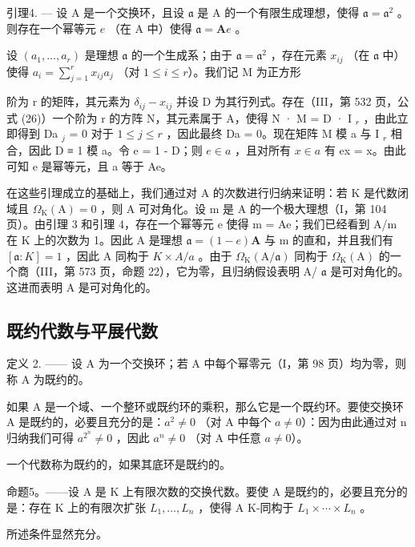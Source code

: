 引理4. --- 设 A 是一个交换环，且设 \(\mathfrak{a}\) 是 A 的一个有限生成理想，使得 \(\mathfrak{a} = \mathfrak{a}^2\) 。则存在一个幂等元 \(e\) （在 A 中）使得 \(\mathfrak{a} = \mathbf{A}e\) 。

设 \((a_{1},\ldots ,a_{r})\) 是理想 \(\mathfrak{a}\) 的一个生成系；由于 \(\mathfrak{a} = \mathfrak{a}^2\) ，存在元素 \(x_{ij}\) （在 \(\mathfrak{a}\) 中）使得 \(a_{i} = \sum_{j = 1}^{r}x_{ij}a_{j}\) （对 \(1\leqslant i\leqslant r\)）。我们记 M 为正方形

阶为 r 的矩阵，其元素为 \(\delta_{ij} - x_{ij}\) 并设 D 为其行列式。存在（III，第 532 页，公式 (26)）一个阶为 r 的方阵 N，其元素属于 A，使得 N · M = D · I \(_{r}\) ，由此立即得到 Da \(_{j}\) = 0 对于 \(1 \leqslant j \leqslant r\) ，因此最终 Da = 0。现在矩阵 M 模 a 与 I \(_{r}\) 相合，因此 D ≡ 1 模 a。令 e = 1 - D；则 \(e \in a\) ，且对所有 \(x \in a\) 有 ex = x。由此可知 e 是幂等元，且 a 等于 Ae。

在这些引理成立的基础上，我们通过对 A 的次数进行归纳来证明：若 K 是代数闭域且 \(\Omega_{\mathrm{K}}(\mathrm{A})=0\) ，则 A 可对角化。设 m 是 A 的一个极大理想（I，第 104 页）。由引理 3 和引理 4，存在一个幂等元 e 使得 m = Ae；我们已经看到 A/m 在 K 上的次数为 1。因此 A 是理想 \(\mathfrak{a}=(1-e)\mathbf{A}\) 与 m 的直和，并且我们有 \([\mathfrak{a}:K]=1\) ，因此 A 同构于 \(K\times A/a\) 。由于 \(\Omega_{\mathrm{K}}(\mathrm{A}/\mathfrak{a})\) 同构于 \(\Omega_{\mathrm{K}}(\mathrm{A})\) 的一个商（III，第 573 页，命题 22），它为零，且归纳假设表明 A/ \(\mathfrak{a}\) 是可对角化的。这进而表明 A 是可对角化的。

\subsection{既约代数与平展代数}

定义 2. —— 设 A 为一个交换环；若 A 中每个幂零元（I，第 98 页）均为零，则称 A 为既约的。

如果 A 是一个域、一个整环或既约环的乘积，那么它是一个既约环。要使交换环 A 是既约的，必要且充分的是：\(a^{2} \neq 0\) （对 A 中每个 \(a \neq 0\)）：因为由此通过对 n 归纳我们可得 \(a^{2^{n}} \neq 0\) ，因此 \(a^{n} \neq 0\) （对 A 中任意 \(a \neq 0\)）。

一个代数称为既约的，如果其底环是既约的。

命题5。——设 A 是 K 上有限次数的交换代数。要使 A 是既约的，必要且充分的是：存在 K 上的有限次扩张 \(L_{1}, \ldots, L_{n}\) ，使得 A K-同构于 \(L_{1} \times \cdots \times L_{n}\) 。

所述条件显然充分。

